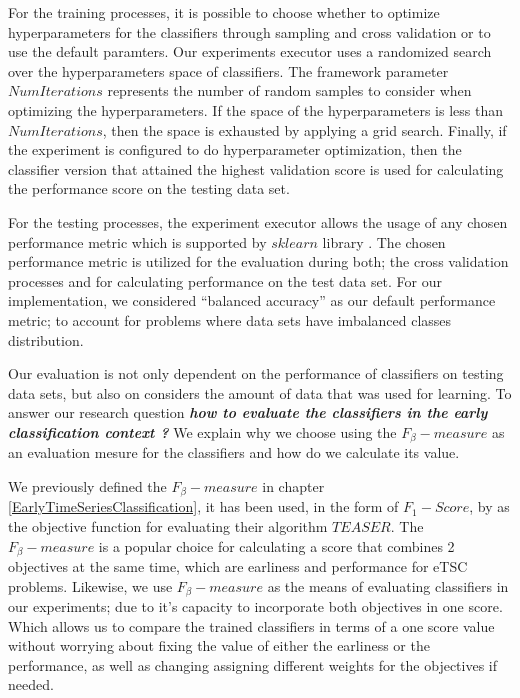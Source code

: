 For the training processes, it is possible to choose whether to optimize hyperparameters for the classifiers through sampling and cross validation or to use the default paramters.
Our experiments executor uses a randomized search over the hyperparameters space of classifiers.
The framework parameter $NumIterations$ represents the number of random samples to consider when optimizing the hyperparameters.
If the space of the hyperparameters is less than $NumIterations$, then the space is exhausted by applying a grid search.
Finally, if the experiment is configured to do hyperparameter optimization,
then the classifier version that attained the highest validation score is used for calculating the performance score on the testing data set.

For the testing processes, the experiment executor allows the usage of any chosen performance metric which is supported by $sklearn$ library \cite{scikit-learn}.
The chosen performance metric is utilized for the evaluation during both; the cross validation processes and for calculating performance on the test data set.
For our implementation, we considered \enquote{balanced accuracy} as our default performance metric; to account for problems where data sets have imbalanced classes distribution.

Our evaluation is not only dependent on the performance of classifiers on testing data sets, but also on considers the amount of data that was used for learning.
To answer our research question \textbf{\textit{how to evaluate the classifiers in the early classification context ?}}
We explain why we choose using the $F_{\beta}-measure$ as an evaluation mesure for the classifiers and how do we calculate its value.

We previously defined the $F_{\beta}-measure$ in chapter \ref{EarlyTimeSeriesClassification}, it has been used, in the form of $F_{1}-Score$, by \cite{schafer2020teaser} as the objective function for evaluating their algorithm $TEASER$.
The $F_{\beta}-measure$ is a popular choice for calculating a score that combines 2 objectives at the same time, which are earliness and performance for eTSC problems.
Likewise, we use $F_{\beta}-measure$ as the means of evaluating classifiers in our experiments; due to it's capacity to incorporate both objectives in one score.
Which allows us to compare the trained classifiers in terms of a one score value without worrying about fixing the value of either the earliness or the performance,
as well as changing assigning different weights for the objectives if needed.

